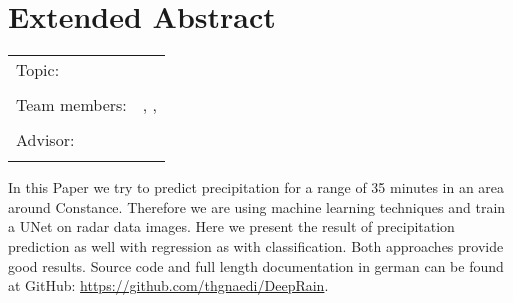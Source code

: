 \chapter*{Extended Abstract}

\begin{center}
	\begingroup
	\renewcommand*{\arraystretch}{1}
	{\makeatletter	
		\begin{tabular}{p{3.2cm}p{9.6cm}}
			Topic: & \thema \\
			& \\
			Team members: & \verfasserA, \verfasserB, \verfasserC \\
			& \\
			Advisor: & \hoschschule \newline \institut \newline \prueferA \\
			& \\
		\end{tabular}
		
		\makeatother}
	\endgroup
\end{center}

\bigskip

In this Paper we try to predict precipitation for a range of 35 minutes in an area around Constance.
Therefore we are using machine learning techniques and train a UNet on radar data images. 
Here we present the result of precipitation prediction as well with regression as with classification. 
Both approaches provide good results. Source code and full length documentation in german can be found at GitHub: \url{https://github.com/thgnaedi/DeepRain}.


\printbibliography[title={References}, heading=subbibliography]

